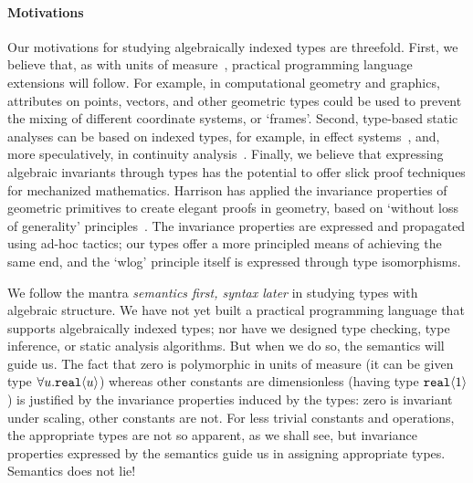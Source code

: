 \documentclass{sigplanconf}
\newcommand{\tyPrim}[2]{\textup{\texttt{#1}}\langle #2 \rangle}
\theoremstyle{examplestyle}
\theoremstyle{restatementstyle}
\begin{document}
\paragraph{Motivations}
Our motivations for studying algebraically indexed types are
threefold. First, we believe that, as with
units of measure~\cite{fsharp}, practical programming language
extensions will follow. For example, in computational geometry and
graphics, attributes on points, vectors, and other geometric types
could be used to prevent the mixing of different coordinate systems,
or `frames'. Second, type-based static analyses can be based on
indexed types, for example, in effect systems~\cite{benton06reading},
and, more speculatively, in continuity
analysis~\cite{chaudhuri10continuity}.  Finally, we believe that
expressing algebraic invariants through types has the potential to
offer slick proof techniques for mechanized
mathematics. Harrison has applied the
invariance properties of geometric primitives to create elegant proofs
in geometry, based on `without loss of
generality' principles~\cite{harrison09without}. The invariance properties are expressed 
and propagated using ad-hoc tactics; our types offer a more principled
means of achieving the same end, and the `wlog' principle itself
is expressed through type isomorphisms.

We follow the mantra \emph{semantics first, syntax later} in studying
types with algebraic structure. We have not yet built a practical
programming language that supports algebraically indexed types; nor
have we designed type checking, type inference, or static analysis
algorithms.  But when we do so, the semantics will guide us. The fact
that zero is polymorphic in units of measure (it can be given type $\forall
u.\tyPrim{real}u$) whereas other constants are dimensionless (having
type $\tyPrim{real}1$) is justified by the invariance properties
induced by the types: zero is invariant under scaling, other constants
are not. For less trivial constants and operations, the appropriate types are
not so apparent, as we shall see, but invariance properties expressed by
the semantics guide us in assigning appropriate types. Semantics does not lie!


\end{document}
